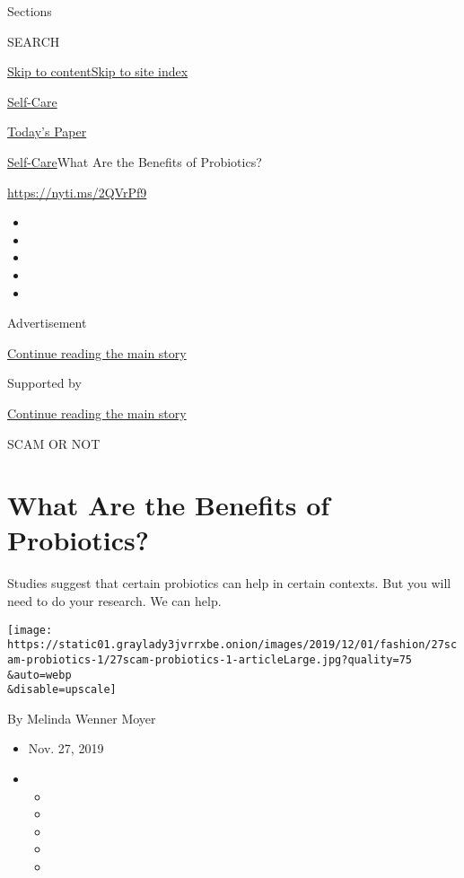 Sections

SEARCH

\protect\hyperlink{site-content}{Skip to
content}\protect\hyperlink{site-index}{Skip to site index}

\href{https://www.nytimes3xbfgragh.onion/section/style/self-care/}{Self-Care}

\href{https://myaccount.nytimes3xbfgragh.onion/auth/login?response_type=cookie\&client_id=vi}{}

\href{https://www.nytimes3xbfgragh.onion/section/todayspaper}{Today's
Paper}

\href{/section/style/self-care/}{Self-Care}\textbar{}What Are the
Benefits of Probiotics?

\href{https://nyti.ms/2QVrPf9}{https://nyti.ms/2QVrPf9}

\begin{itemize}
\item
\item
\item
\item
\item
\end{itemize}

Advertisement

\protect\hyperlink{after-top}{Continue reading the main story}

Supported by

\protect\hyperlink{after-sponsor}{Continue reading the main story}

SCAM OR NOT

\hypertarget{what-are-the-benefits-of-probiotics}{%
\section{What Are the Benefits of
Probiotics?}\label{what-are-the-benefits-of-probiotics}}

Studies suggest that certain probiotics can help in certain contexts.
But you will need to do your research. We can help.

\texttt{[image: https://static01.graylady3jvrrxbe.onion/images/2019/12/01/fashion/27scam-probiotics-1/27scam-probiotics-1-articleLarge.jpg?quality=75\\\&auto=webp\\\&disable=upscale]}

By Melinda Wenner Moyer

\begin{itemize}
\item
  Nov. 27, 2019
\item
  \begin{itemize}
  \item
  \item
  \item
  \item
  \item
  \end{itemize}
\end{itemize}

